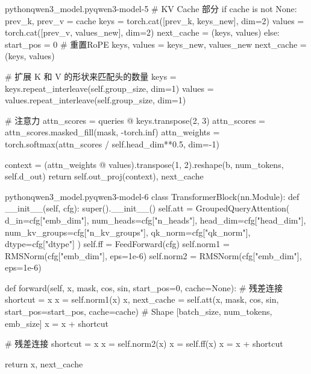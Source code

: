 \documentclass[lang=cn,newtx,10pt,scheme=chinese]{elegantbook}
\begin{document}
\begin{codebox}{python}{qwen3\_model.py}{qwen3-model-5}
        # KV Cache 部分
        if cache is not None:
            prev_k, prev_v = cache
            keys = torch.cat([prev_k, keys_new], dim=2)
            values = torch.cat([prev_v, values_new], dim=2)
            next_cache = (keys, values)
        else:
            start_pos = 0  # 重置RoPE
            keys, values = keys_new, values_new
            next_cache = (keys, values)

        # 扩展 K 和 V 的形状来匹配头的数量
        keys = keys.repeat_interleave(self.group_size, dim=1)
        values = values.repeat_interleave(self.group_size, dim=1)

        # 注意力
        attn_scores = queries @ keys.transpose(2, 3)
        attn_scores = attn_scores.masked_fill(mask, -torch.inf)
        attn_weights = torch.softmax(attn_scores / self.head_dim**0.5, dim=-1)

        context = (attn_weights @ values).transpose(1, 2).reshape(b, num_tokens, self.d_out)
        return self.out_proj(context), next_cache
\end{codebox}

\begin{codebox}{python}{qwen3\_model.py}{qwen3-model-6}
class TransformerBlock(nn.Module):
    def __init__(self, cfg):
        super().__init__()
        self.att = GroupedQueryAttention(
            d_in=cfg["emb_dim"],
            num_heads=cfg["n_heads"],
            head_dim=cfg["head_dim"],
            num_kv_groups=cfg["n_kv_groups"],
            qk_norm=cfg["qk_norm"],
            dtype=cfg["dtype"]
        )
        self.ff = FeedForward(cfg)
        self.norm1 = RMSNorm(cfg["emb_dim"], eps=1e-6)
        self.norm2 = RMSNorm(cfg["emb_dim"], eps=1e-6)

    def forward(self, x, mask, cos, sin, start_pos=0, cache=None):
        # 残差连接
        shortcut = x
        x = self.norm1(x)
        x, next_cache = self.att(x, mask, cos, sin, start_pos=start_pos, cache=cache)  # Shape [batch_size, num_tokens, emb_size]
        x = x + shortcut

        # 残差连接
        shortcut = x
        x = self.norm2(x)
        x = self.ff(x)
        x = x + shortcut

        return x, next_cache
\end{codebox}
\end{document}
